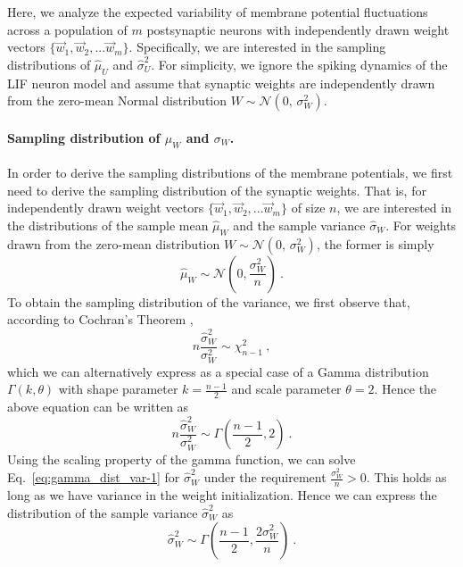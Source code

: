 \documentclass[11pt,a4paper]{article}
\begin{document}
\begin{refsection}
Here, we analyze the expected variability of membrane potential fluctuations across a 
population of $m$ postsynaptic neurons with independently drawn weight vectors
$\{\vec{w}_{1}, \vec{w}_{2}, ... \vec{w}_{m}\}$. Specifically, we are interested in the 
sampling distributions of $\hat \mu_U$ and $\hat \sigma_U^2$. 
For simplicity, we ignore the spiking dynamics of the \ac{LIF} neuron model and assume that synaptic weights are independently drawn from the zero-mean Normal distribution $W \sim \mathcal{N}(0,\,\sigma_W^2)$. 

\paragraph{Sampling distribution of $\mu_W$ and $\sigma_W$.} 
In order to derive the sampling distributions of the membrane potentials, we first need to derive the sampling distribution of the synaptic weights. 
That is, for independently drawn weight vectors $\{\vec{w}_{1}, \vec{w}_{2}, ... \vec{w}_{m}\}$ of size $n$, we are interested in the distributions of the sample mean $\hat \mu_W$ and the sample variance $\hat \sigma_W$. For weights drawn from the zero-mean distribution $W \sim \mathcal{N}(0,\,\sigma_W^2)$, the former is simply
\begin{equation}
    \hat \mu_W \sim \mathcal{N} \left(0, \frac{\sigma_W^2}{n} \right) ~.
\end{equation}
To obtain the sampling distribution of the variance, we first observe that, according to Cochran's Theorem \citep{Cochran1934-rw}, 
\begin{equation}
    n \frac{\hat \sigma_W^2}{\sigma_W^2} \sim \chi^2_{n-1}  ~,
\end{equation}
which we can alternatively express as a special case of a Gamma distribution $\Gamma\left(k, \theta \right)$ with shape parameter $k=\frac{n-1}{2}$ and scale parameter $\theta=2$. Hence the above equation can be written as
\begin{equation}
    n \frac{\hat \sigma_W^2}{\sigma_W^2} \sim \Gamma \left(\frac{n-1}{2}, 2 \right) ~ .
    \label{eq:gamma_dist_var-1}
\end{equation}
Using the scaling property of the gamma function, we can solve Eq.~\eqref{eq:gamma_dist_var-1} for $\hat \sigma_W^2$ under the requirement $\frac{\sigma_W^2}{n}>0$. This holds as long as we have variance in the weight initialization. Hence we can express the distribution of the sample variance $\hat\sigma_W^2$ as
\begin{equation}
    \hat \sigma_W^2 \sim \Gamma \left(\frac{n-1}{2}, \frac{2 \sigma_W^2}{n} \right)  ~.
\end{equation}



\end{refsection}
\end{document}
